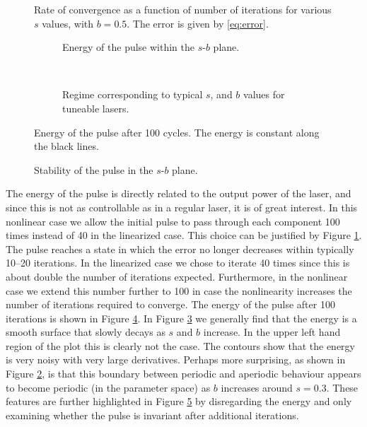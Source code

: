 \begin{figure}[tbp]
\centering

\caption{Rate of convergence as a function of number of iterations for various $s$ values, with $b = 0.5$. The error is given by \eqref{eq:error}.}
\label{fig:roc}
\end{figure}

\begin{figure}[p]
\centering
\begin{subfigure}{\textwidth}

\caption{Energy of the pulse within the $s$-$b$ plane.}
\label{fig:energybig}
\end{subfigure} \\
\begin{subfigure}{\textwidth}

\caption{Regime corresponding to typical $s$, and $b$ values for tuneable lasers.}
\label{fig:energyzoom}
\end{subfigure}
\caption[Energy of the pulse.]{Energy of the pulse after 100 cycles. The energy is constant along the black lines.}
\label{fig:energy}
\end{figure}

\begin{figure}[tbp]

\caption{Stability of the pulse in the $s$-$b$ plane.}
\label{fig:cartoon}
\end{figure}

The energy of the pulse is directly related to the output power of the laser, and since this is not as controllable as in a regular laser, it is of great interest. In this nonlinear case we allow the initial pulse to pass through each component 100 times instead of 40 in the linearized case. This choice can be justified by Figure \ref{fig:roc}. The pulse reaches a state in which the error no longer decreases within typically 10--20 iterations. In the linearized case we chose to iterate 40 times since this is about double the number of iterations expected. Furthermore, in the nonlinear case we extend this number further to 100 in case the nonlinearity increases the number of iterations required to converge. The energy of the pulse after 100 iterations is shown in Figure \ref{fig:energy}. In Figure \ref{fig:energyzoom} we generally find that the energy is a smooth surface that slowly decays as $s$ and $b$ increase. In the upper left hand region of the plot this is clearly not the case. The contours show that the energy is very noisy with very large derivatives. Perhaps more surprising, as shown in Figure \ref{fig:energybig}, is that this boundary between periodic and aperiodic behaviour appears to become periodic (in the parameter space) as $b$ increases around $s = 0.3$. These features are further highlighted in Figure \ref{fig:cartoon} by disregarding the energy and only examining whether the pulse is invariant after additional iterations. \\

